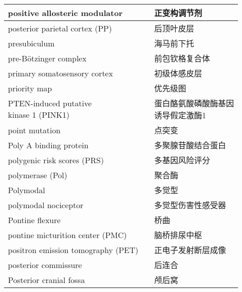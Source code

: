 \begin{longtable}{lll}
	\midrule
	positive allosteric modulator   && 正变构调节剂   \\
	
	\midrule
	posterior parietal cortex (PP)   && 后顶叶皮层   \\
	
	\midrule
	presubiculum   && 海马前下托   \\
	
	\midrule
	pre-Bötzinger complex   && 前包钦格复合体   \\
	
	\midrule
	primary somatosensory cortex   && 初级体感皮层   \\
	
	\midrule
	priority map   && 优先级图   \\
	
	\midrule
	\makecell[l]{PTEN-induced putative \\kinase 1 (PINK1)}     && \makecell[l]{蛋白酪氨酸磷酸酶基因\\诱导假定激酶1}   \\
	
	\midrule
	point mutation     && 点突变   \\
	
	\midrule
	Poly A binding protein     && 多聚腺苷酸结合蛋白   \\
	
	\midrule
	polygenic risk scores (PRS)     && 多基因风险评分   \\
	
	\midrule
	polymerase (Pol)     && 聚合酶   \\
	
	\midrule
	Polymodal     && 多觉型   \\
	
	\midrule
	polymodal nociceptor     && 多觉型伤害性感受器   \\
	
	\midrule
	Pontine flexure     && 桥曲   \\
	
	\midrule
	pontine micturition center  (PMC)   && 脑桥排尿中枢   \\
	
	\midrule
	positron emission tomography (PET)     && 正电子发射断层成像   \\
	
	\midrule
	posterior commissure     && 后连合   \\
	
	\midrule
	Posterior cranial fossa     && 颅后窝   \\
	

\end{longtable}
